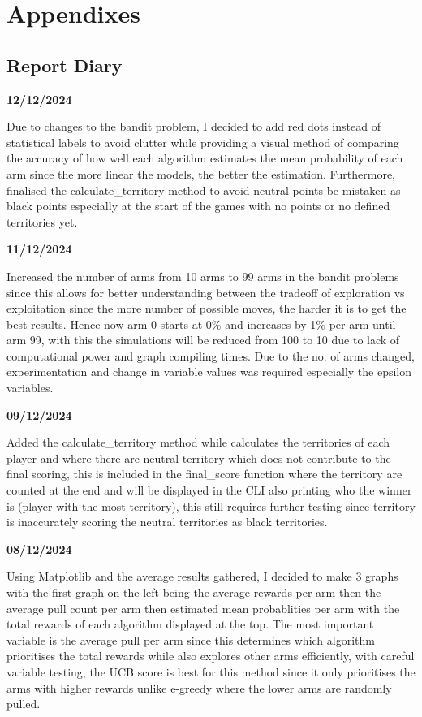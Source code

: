 \documentclass[]{final_report}
\begin{document}
\chapter{Appendixes}

\section{Report Diary}


\textbf{12/12/2024}

Due to changes to the bandit problem, I decided to add red dots instead of statistical labels to avoid clutter while providing a visual method of comparing the accuracy of how well each algorithm estimates the mean probability of each arm since the more linear the models, the better the estimation. Furthermore, finalised the calculate\_territory method to avoid neutral points be mistaken as black points especially at the start of the games with no points or no defined territories yet. 

\textbf{11/12/2024}

Increased the number of arms from 10 arms to 99 arms in the bandit problems since this allows for better understanding between the tradeoff of exploration vs exploitation since the more number of possible moves, the harder it is to get the best results. Hence now arm 0 starts at 0\% and increases by 1\% per arm until arm 99, with this the simulations will be reduced from 100 to 10 due to lack of computational power and graph compiling times. Due to the no. of arms changed, experimentation and change in variable values was required especially the epsilon variables. 
  
\textbf{09/12/2024}

Added the calculate\_territory method while calculates the territories of each player and where there are neutral territory which does not contribute to the final scoring, this is included in the final\_score function where the territory are counted at the end and will be displayed in the CLI also printing who the winner is (player with the most territory), this still requires further testing since territory is inaccurately scoring the neutral territories as black territories.

\textbf{08/12/2024}

Using Matplotlib and the average results gathered, I decided to make 3 graphs with the first graph on the left being the average rewards per arm then the average pull count per arm then estimated mean probablities per arm with the total rewards of each algorithm displayed at the top. The most important variable is the average pull per arm since this determines which algorithm prioritises the total rewards while also explores other arms efficiently, with careful variable testing, the UCB score is best for this method since it only prioritises the arms with higher rewards unlike e-greedy where the lower arms are randomly pulled. 
  
\end{document}
